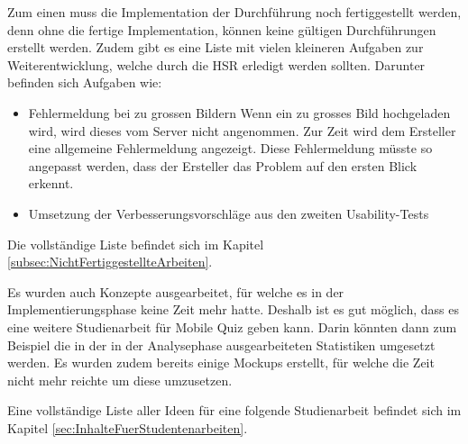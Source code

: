 Zum einen muss die Implementation der Durchführung noch fertiggestellt werden, denn ohne die fertige Implementation, können keine gültigen Durchführungen erstellt werden. Zudem gibt es eine Liste mit vielen kleineren Aufgaben zur Weiterentwicklung, welche durch die HSR erledigt werden sollten. Darunter befinden sich Aufgaben wie:
\begin{itemize}
	\item Fehlermeldung bei zu grossen Bildern
	Wenn ein zu grosses Bild hochgeladen wird, wird dieses vom Server nicht angenommen. Zur Zeit wird dem Ersteller eine allgemeine Fehlermeldung angezeigt. Diese Fehlermeldung müsste so angepasst werden, dass der Ersteller das Problem auf den ersten Blick erkennt.
	\item Umsetzung der Verbesserungsvorschläge aus den zweiten \gls{Usability-Test}s
\end{itemize}

\noindent Die vollständige Liste befindet sich im Kapitel \ref{subsec:NichtFertiggestellteArbeiten}.

\bigskip

Es wurden auch Konzepte ausgearbeitet, für welche es in der Implementierungsphase keine Zeit mehr hatte. Deshalb ist es gut möglich, dass es eine weitere Studienarbeit für Mobile Quiz geben kann. Darin könnten dann zum Beispiel die in der in der Analysephase ausgearbeiteten Statistiken umgesetzt werden. Es wurden zudem bereits einige Mockups erstellt, für welche die Zeit nicht mehr reichte um diese umzusetzen.

\bigskip

\noindent Eine vollständige Liste aller Ideen für eine folgende Studienarbeit befindet sich im Kapitel \ref{sec:InhalteFuerStudentenarbeiten}.